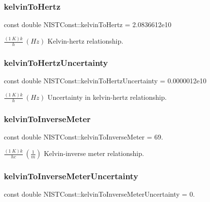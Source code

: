 \subsubsection{\texorpdfstring{kelvin\+To\+Hertz}{kelvinToHertz}}
{\footnotesize\ttfamily const double N\+I\+S\+T\+Const\+::kelvin\+To\+Hertz = 2.\+0836612e10}

$\frac{(1\ K)k}{h} \ (Hz)$ Kelvin-\/hertz relationship. \mbox{\label{group___kelvin_gaab1ae20957d14cd50d787ad307a1a45d}} 
\subsubsection{\texorpdfstring{kelvin\+To\+Hertz\+Uncertainty}{kelvinToHertzUncertainty}}
{\footnotesize\ttfamily const double N\+I\+S\+T\+Const\+::kelvin\+To\+Hertz\+Uncertainty = 0.\+0000012e10}

$\frac{(1\ K)k}{h} \ (Hz)$ Uncertainty in kelvin-\/hertz relationship. \mbox{\label{group___kelvin_ga361938b994609879a0377a94e49dacf2}} 
\subsubsection{\texorpdfstring{kelvin\+To\+Inverse\+Meter}{kelvinToInverseMeter}}
{\footnotesize\ttfamily const double N\+I\+S\+T\+Const\+::kelvin\+To\+Inverse\+Meter = 69.}

$\frac{(1\ K)k}{hc} \ (\frac{1}{m})$ Kelvin-\/inverse meter relationship. \mbox{\label{group___kelvin_ga8867224cfd317842c338873d002a4f94}} 
\subsubsection{\texorpdfstring{kelvin\+To\+Inverse\+Meter\+Uncertainty}{kelvinToInverseMeterUncertainty}}
{\footnotesize\ttfamily const double N\+I\+S\+T\+Const\+::kelvin\+To\+Inverse\+Meter\+Uncertainty = 0.}


